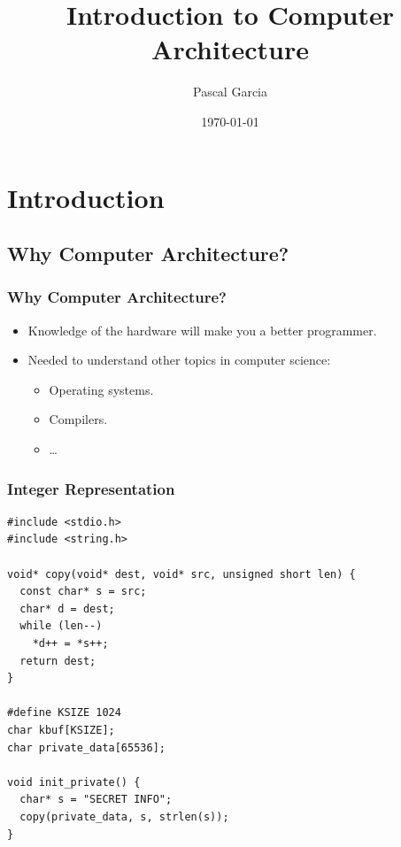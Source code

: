 \documentclass{beamer}
\title{Introduction to Computer Architecture}
\author{Pascal Garcia}
\institute{}
\date{\today}
\begin{document}

\frame{\titlepage}


\begin{frame}[allowframebreaks]
  \scriptsize
  \vspace{0.1cm}
  \tableofcontents
\end{frame}

\section{Introduction}

\subsection{Why Computer Architecture?}

\begin{frame}%
\frametitle{Why Computer Architecture?}

\begin{itemize}

\item Knowledge of the hardware will make you a better programmer.

\vspace{0.5cm}

\item Needed to understand other topics in computer science:
  \begin{itemize}
  \item Operating systems.
  \item Compilers.
  \item \ldots
  \end{itemize}

\end{itemize}

\end{frame}

\begin{frame}[fragile]
\frametitle{Integer Representation}
\scriptsize
\begin{lstlisting}
#include <stdio.h>
#include <string.h>

void* copy(void* dest, void* src, unsigned short len) {
  const char* s = src;
  char* d = dest;
  while (len--)
    *d++ = *s++;
  return dest;
}

#define KSIZE 1024
char kbuf[KSIZE];
char private_data[65536];

void init_private() {
  char* s = "SECRET INFO";
  copy(private_data, s, strlen(s));
}
\end{lstlisting}

\end{frame}
\end{document}
